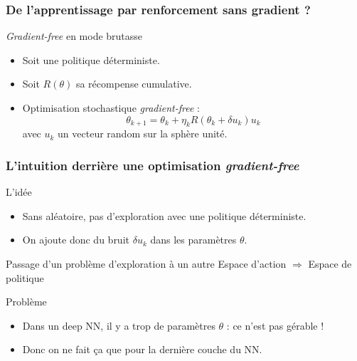 \documentclass[smaller]{beamer}
\begin{document}

\begin{frame}
  \frametitle{De l'apprentissage par renforcement sans gradient ?}

  \begin{block}{{\it Gradient-free} en mode brutasse}
    \begin{itemize}
    \item Soit une politique déterministe.
    \item Soit $R(\theta)$ sa récompense cumulative.
    \item Optimisation stochastique {\it gradient-free} :
      \begin{displaymath}
        \theta_{k+1} = \theta_k + \eta_k R(\theta_k + \delta u_k) u_k
      \end{displaymath}
      avec $u_k$ un vecteur random sur la sphère unité.
    \end{itemize}
  \end{block}

\end{frame}


\begin{frame}
  \frametitle{L'intuition derrière une optimisation {\it gradient-free}}

  \begin{exampleblock}{L'idée}
    \begin{itemize}
    \item  Sans  aléatoire,  pas   d'exploration  avec  une  politique
      déterministe.
    \item On  ajoute donc  du bruit $\delta  u_k$ dans  les paramètres
      $\theta$.
    \end{itemize}    
  \end{exampleblock}

  {
    \begin{block}{Passage d'un problème d'exploration à un autre}
      Espace d'action $\Rightarrow$ Espace de politique
    \end{block}
  }
  
  {
    \begin{alertblock}{Problème}
      \begin{itemize}
      \item Dans  un deep NN,  il y a trop  de paramètres $\theta$  : ce
        n'est pas gérable !
      \item Donc on ne fait ça que pour la dernière couche du NN.
      \end{itemize}    
    \end{alertblock}
  }

\end{frame}
\end{document}
